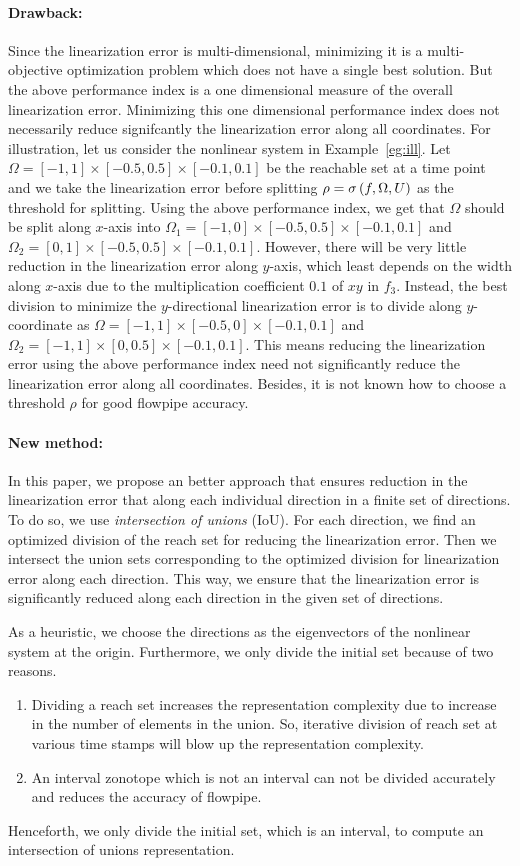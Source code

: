 \paragraph{Drawback:}  Since the linearization error is
multi-dimensional, minimizing it is a multi-objective optimization
problem which does not have a single best solution.  But the above
performance index is a one dimensional measure of the overall
linearization error.  Minimizing this one dimensional performance
index does not necessarily reduce signifcantly the linearization error
along all coordinates.  For illustration, let us consider the
nonlinear system in Example~\ref{eg:ill}.  Let $\Omega =
[-1,1]\times[-0.5,0.5]\times[-0.1,0.1]$ be the reachable set at a time
point and we take the linearization error before splitting $\rho
= \sigma\left(f,\Omega,U\right)$ as the threshold for splitting.  Using the
above performance index, we get that $\Omega$ should be split along
$x$-axis into $\Omega_1 = [-1,0]\times[-0.5,0.5]\times[-0.1,0.1]$ and
$\Omega_2 = [0,1]\times[-0.5,0.5]\times[-0.1,0.1]$.  However, there
will be very little reduction in the linearization error along
$y$-axis, which least depends on the width along $x$-axis due to the
multiplication coefficient $0.1$ of $xy$ in $f_3$.  Instead, the best
division to minimize the $y$-directional linearization error is to
divide along $y$-coordinate as $\Omega =
[-1,1]\times[-0.5,0]\times[-0.1,0.1]$ and $\Omega_2 =
[-1,1]\times[0,0.5]\times[-0.1,0.1]$.  This means reducing the
linearization error using the above performance index need not
significantly reduce the linearization error along all coordinates.
Besides, it is not known how to choose a threshold $\rho$ for good
flowpipe accuracy.

\paragraph{New method:}  In this paper, we propose an better approach
that ensures reduction in the linearization error that along each
individual direction in a finite set of directions.  To do so, we
use \emph{intersection of unions} (IoU).  For each direction, we find
an optimized division of the reach set for reducing the linearization
error.  Then we intersect the union sets corresponding to the
optimized division for linearization error along each direction.  This
way, we ensure that the linearization error is significantly reduced
along each direction in the given set of directions.

As a heuristic, we choose the directions as the eigenvectors of the
nonlinear system at the origin.  Furthermore, we only divide the initial set
because of two reasons.
%
\begin{enumerate}
\item Dividing a reach set increases the representation complexity due to
increase in the number of elements in the union.  So, iterative
division of reach set at various time stamps will blow up the
representation complexity.
\item  An interval zonotope which is not an interval can not
be divided accurately and reduces the accuracy of flowpipe.
\end{enumerate}
%
Henceforth, we only divide the initial set, which is an interval, to
compute an intersection of unions representation.
%
